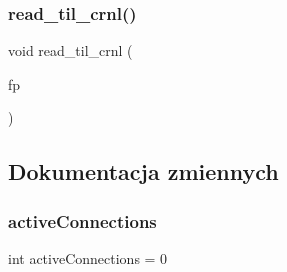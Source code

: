 \subsubsection{\texorpdfstring{read\_til\_crnl()}{read\_til\_crnl()}}
{\footnotesize\ttfamily void read\+\_\+til\+\_\+crnl (\begin{DoxyParamCaption}\item[{F\+I\+LE $\ast$}]{fp }\end{DoxyParamCaption})}



\subsection{Dokumentacja zmiennych}
\mbox{\label{10b-serwer_8c_a1f5bcbe2b6bbbf057f1e857d6466ac34}} 
\subsubsection{\texorpdfstring{activeConnections}{activeConnections}}
{\footnotesize\ttfamily int active\+Connections = 0}

